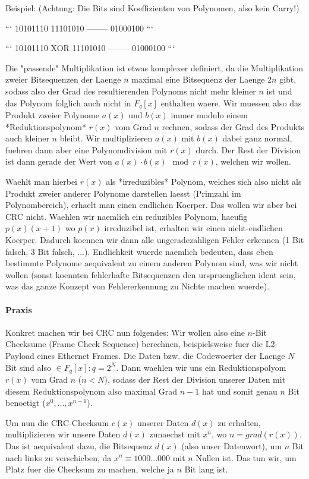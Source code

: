 Beispiel: (Achtung: Die Bits sind Koeffizienten von Polynomen, also kein Carry!)

```
10101110
11101010
--------
01000100
```

```
10101110 XOR
11101010
--------
01000100
```

Die "passende" Multiplikation ist etwas komplexer definiert, da die
Multiplikation zweier Bitsequenzen der Laenge $n$ maximal eine Bitsequenz der
Laenge $2n$ gibt, sodass also der Grad des resultierenden Polynoms nicht mehr
kleiner $n$ ist und das Polynom folglich auch nicht in $F_q[x]$ enthalten
waere. Wir muessen also das Produkt zweier Polynome $a(x)$ und $b(x)$ immer
modulo einem *Reduktionspolynom* $r(x)$ vom Grad $n$ rechnen, sodass der Grad
des Produkts auch kleiner $n$ bleibt. Wir multiplizieren $a(x)$ mit $b(x)$ dabei
ganz normal, fuehren dann aber eine Polynomdivision mit $r(x)$ durch. Der Rest
der Division ist dann gerade der Wert von $a(x) \cdot b(x) \mod r(x)$, welchen
wir wollen.

Waehlt man hierbei $r(x)$ als *irreduzibles* Polynom, welches sich also nicht
als Produkt zweier anderer Polynome darstellen laesst (Primzahl im
Polynombereich), erhaelt man einen endlichen Koerper. Das wollen wir aber bei
CRC nicht. Waehlen wir naemlich ein reduzibles Polynom, haeufig $p(x)(x + 1)$ wo
$p(x)$ irreduzibel ist, erhalten wir einen nicht-endlichen Koerper. Dadurch
koennen wir dann alle ungeradezahligen Fehler erkennen (1 Bit falsch, 3 Bit
falsch, ...). Endlichkeit wuerde naemlich bedeuten, dass eben bestimmte Polynome
aequivalent zu einem anderen Polynom sind, was wir nicht wollen (sonst koennten
fehlerhafte Bitsequenzen den urspruenglichen ident sein, was das ganze Konzept
von Fehlererkennung zu Nichte machen wuerde).

\paragraph{Praxis} 

Konkret machen wir bei CRC nun folgendes: Wir wollen also eine $n$-Bit Checksume
(Frame Check Sequence) berechnen, beispielsweise fuer die L2-Payload eines
Ethernet Frames. Die Daten bzw. die Codewoerter der Laenge $N$ Bit sind also
$\in F_q[x]: q = 2^N$. Dann waehlen wir uns ein Reduktionspolyom $r(x)$ vom Grad
$n$ ($n < N$), sodass der Rest der Division unserer Daten mit diesem
Reduktionspolynom also maximal Grad $n - 1$ hat und somit genau $n$ Bit
benoetigt ($x^0, ..., x^{n - 1}$).

Um nun die CRC-Checksum $c(x)$ unserer Daten $d(x)$ zu erhalten, multiplizieren
wir unsere Daten $d(x)$ zunaechst mit $x^n$, wo $n = grad(r(x))$. Das ist
aequivalent dazu, die Bitsequenz $d(x)$ (also unser Datenwort), um $n$ Bit nach
links zu verschieben, da $x^n \equiv 1000...000$ mit $n$ Nullen ist. Das tun
wir, um Platz fuer die Checksum zu machen, welche ja $n$ Bit lang ist.

